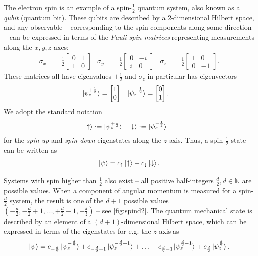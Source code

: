\documentclass[12pt,final,3p]{elsarticle}
\begin{document}
The electron spin is an example of a spin-{$\frac{1}{2}$} quantum system, also known as a \emph{qubit} (quantum bit). These qubits are described by a 2-dimensional Hilbert space, and any observable -- corresponding to the spin components along some direction -- can be expressed in terms of the \emph{Pauli spin matrices} representing measurements along the $x,y,z$ axes:
\begin{align}\label{eq:paulispin}
\sigma_{x} 
&= 
\frac{1}{2}\begin{bmatrix}
0 & 1 \\ 
1 & 0 
\end{bmatrix} 
&
\sigma_{y}
&= 
\frac{1}{2}\begin{bmatrix}
0 & -i \\ 
i & 0 
\end{bmatrix} 
&
\sigma_{z}
&= 
\frac{1}{2}\begin{bmatrix}
1 & 0 \\ 
0 & -1 
\end{bmatrix}.
\end{align}
These matrices all have eigenvalues $\pm \frac{1}{2}$ and $\sigma_{z}$ in particular has eigenvectors 
\begin{align}
\ket{\psi_{z}^{+\frac{1}{2}}} 
&=  
\begin{bmatrix}
1 \\
0
\end{bmatrix} 
&
\ket{\psi_{z}^{-\frac{1}{2}}} 
&= 
\begin{bmatrix}
0 \\
1
\end{bmatrix}.
\end{align}
We adopt the standard notation
\begin{align}
\ket{\uparrow} &:= \ket{\psi_{z}^{+\frac{1}{2}}}  & \ket{\downarrow} &:= \ket{\psi_{z}^{-\frac{1}{2}}} 
\end{align}
for the \emph{spin-up} and \emph{spin-down} eigenstates along the $z$-axis. Thus, a spin-$\frac{1}{2}$ state can be written as
\begin{align}
\ket{\psi} = c_{\uparrow}\ket{\uparrow} + c_{\downarrow}\ket{\downarrow}.
\end{align}

Systems with spin higher than $\frac{1}{2}$ also exist -- all positive half-integers $\frac{d}{2}, d \in \mathbb{N}$ are possible values. When a component of angular momentum is measured for a spin-$\frac{d}{2}$ system, the result is one of the $d+1$ possible values $(-\frac{d}{2}, -\frac{d}{2}+1, \ldots, +\frac{d}{2}-1, +\frac{d}{2})$ -- see \autoref{fig:spind2}. The quantum mechanical state is described by an element of a $(d+1)$-dimensional Hilbert space, which can be expressed in terms of the eigenstates for e.g. the $z$-axis as
\begin{align}
\ket{\psi} = c_{-\frac{d}{2}}\ket{\psi_{z}^{-\frac{d}{2}}} + c_{-\frac{d}{2} + 1}\ket{\psi_{z}^{-\frac{d}{2} + 1}} + \ldots + c_{\frac{d}{2} -1}\ket{\psi_{z}^{\frac{d}{2}-1}} + c_{\frac{d}{2}}\ket{\psi_{z}^{\frac{d}{2}}}.
\end{align}
\end{document}
